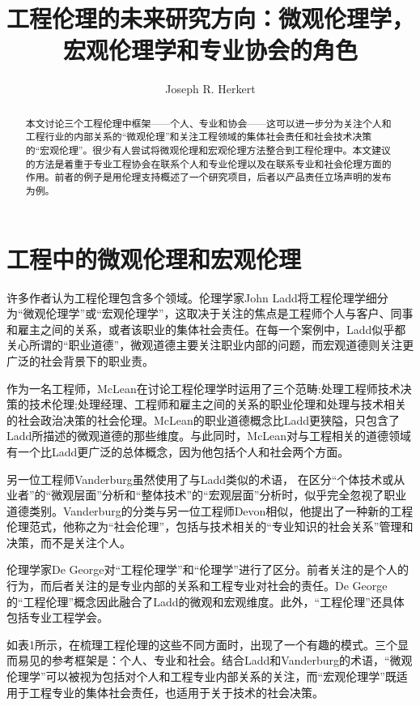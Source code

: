 \documentclass[lang=cn,11pt,a4paper]{elegantpaper}
\title{工程伦理的未来研究方向：微观伦理学，宏观伦理学和专业协会的角色}
\author{Joseph R. Herkert}
\institute{North Carolina State University, USA}
\date{}
\begin{document}
\maketitle

\begin{abstract}
本文讨论三个工程伦理中框架——个人、专业和协会——这可以进一步分为关注个人和工程行业的内部关系的“微观伦理”和关注工程领域的集体社会责任和社会技术决策的“宏观伦理”。很少有人尝试将微观伦理和宏观伦理方法整合到工程伦理中。本文建议的方法是着重于专业工程协会在联系个人和专业伦理以及在联系专业和社会伦理方面的作用。前者的例子是用伦理支持概述了一个研究项目，后者以产品责任立场声明的发布为例。
\end{abstract}



\section{工程中的微观伦理和宏观伦理\cite{1,2}}
许多作者认为工程伦理包含多个领域。伦理学家John Ladd\cite{3}将工程伦理学细分为“微观伦理学”或“宏观伦理学”，这取决于关注的焦点是工程师个人与客户、同事和雇主之间的关系，或者该职业的集体社会责任。在每一个案例中，Ladd似乎都关心所谓的“职业道德”，微观道德主要关注职业内部的问题，而宏观道德则关注更广泛的社会背景下的职业责。

作为一名工程师，McLean\cite{4}在讨论工程伦理学时运用了三个范畴:处理工程师技术决策的技术伦理;处理经理、工程师和雇主之间的关系的职业伦理和处理与技术相关的社会政治决策的社会伦理。McLean的职业道德概念比Ladd更狭隘，只包含了Ladd所描述的微观道德的那些维度。与此同时，McLean对与工程相关的道德领域有一个比Ladd更广泛的总体概念，因为他包括个人和社会两个方面。

另一位工程师Vanderburg\cite{5}虽然使用了与Ladd类似的术语，
在区分“个体技术或从业者”的“微观层面”分析和“整体技术”的“宏观层面”分析时，似乎完全忽视了职业道德类别。Vanderburg的分类与另一位工程师Devon相似，\cite{6}他提出了一种新的工程伦理范式，他称之为“社会伦理”，包括与技术相关的“专业知识的社会关系”管理和决策，而不是关注个人。

伦理学家De George\cite{7}对“工程伦理学”和“伦理学”进行了区分。前者关注的是个人的行为，而后者关注的是专业内部的关系和工程专业对社会的责任。De George的“工程伦理”概念因此融合了Ladd的微观和宏观维度。此外，“工程伦理”还具体包括专业工程学会。

如表1所示，在梳理工程伦理的这些不同方面时，出现了一个有趣的模式。三个显而易见的参考框架是：个人、专业和社会。结合Ladd和Vanderburg的术语，“微观伦理学”可以被视为包括对个人和工程专业内部关系的关注，而“宏观伦理学”既适用于工程专业的集体社会责任，也适用于关于技术的社会决策。
\end{document}
